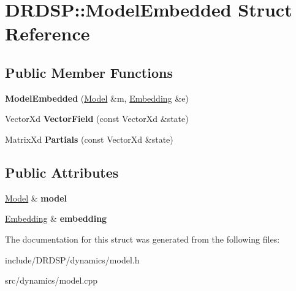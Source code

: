 \hypertarget{struct_d_r_d_s_p_1_1_model_embedded}{\section{D\-R\-D\-S\-P\-:\-:Model\-Embedded Struct Reference}
\label{struct_d_r_d_s_p_1_1_model_embedded}
}
\subsection*{Public Member Functions}
\begin{DoxyCompactItemize}
\item 
\hypertarget{struct_d_r_d_s_p_1_1_model_embedded_aac8110fc1d52b006311cc1ca9377a8d4}{{\bfseries Model\-Embedded} (\hyperlink{struct_d_r_d_s_p_1_1_model}{Model} \&m, \hyperlink{struct_d_r_d_s_p_1_1_embedding}{Embedding} \&e)}\label{struct_d_r_d_s_p_1_1_model_embedded_aac8110fc1d52b006311cc1ca9377a8d4}

\item 
\hypertarget{struct_d_r_d_s_p_1_1_model_embedded_a4f33e3c6473e997ae92c75771aa918fd}{Vector\-Xd {\bfseries Vector\-Field} (const Vector\-Xd \&state)}\label{struct_d_r_d_s_p_1_1_model_embedded_a4f33e3c6473e997ae92c75771aa918fd}

\item 
\hypertarget{struct_d_r_d_s_p_1_1_model_embedded_a6aaa71ce7c8a2b11f86e7950498249c0}{Matrix\-Xd {\bfseries Partials} (const Vector\-Xd \&state)}\label{struct_d_r_d_s_p_1_1_model_embedded_a6aaa71ce7c8a2b11f86e7950498249c0}

\end{DoxyCompactItemize}
\subsection*{Public Attributes}
\begin{DoxyCompactItemize}
\item 
\hypertarget{struct_d_r_d_s_p_1_1_model_embedded_a2d021cf215cdd084fde36bbd46101cc5}{\hyperlink{struct_d_r_d_s_p_1_1_model}{Model} \& {\bfseries model}}\label{struct_d_r_d_s_p_1_1_model_embedded_a2d021cf215cdd084fde36bbd46101cc5}

\item 
\hypertarget{struct_d_r_d_s_p_1_1_model_embedded_a22aeda6bb7f303b3e79a6f133887439b}{\hyperlink{struct_d_r_d_s_p_1_1_embedding}{Embedding} \& {\bfseries embedding}}\label{struct_d_r_d_s_p_1_1_model_embedded_a22aeda6bb7f303b3e79a6f133887439b}

\end{DoxyCompactItemize}


The documentation for this struct was generated from the following files\-:\begin{DoxyCompactItemize}
\item 
include/\-D\-R\-D\-S\-P/dynamics/model.\-h\item 
src/dynamics/model.\-cpp\end{DoxyCompactItemize}
